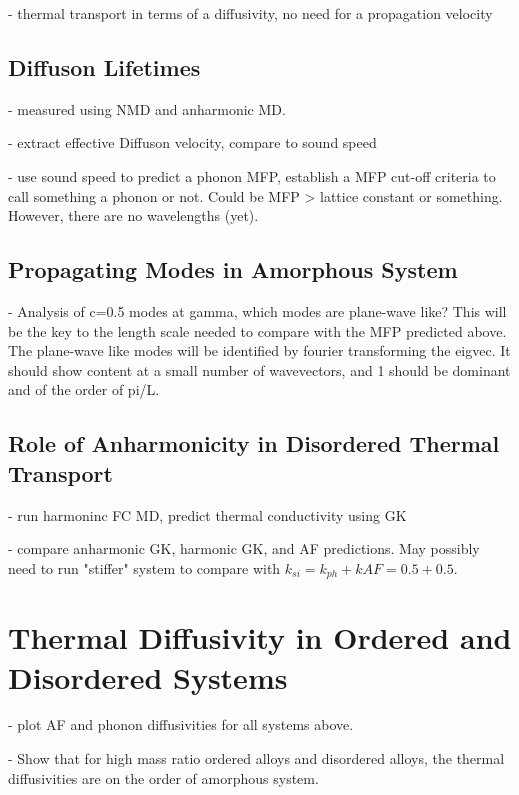 \documentclass[aps,prb,preprint,superscriptaddress,amsmath,amssymb,floatfix]{revtex4}
\begin{document}
- thermal transport in terms of a diffusivity, no need for a propagation velocity

\subsection{\label{S-Motivation-Amorphous}Diffuson Lifetimes}

- measured using NMD and anharmonic MD.

- extract effective Diffuson velocity, compare to sound speed

- use sound speed to predict a phonon MFP, establish a MFP cut-off criteria to call something a phonon or not.  Could be MFP > lattice constant or something.  However, there are no wavelengths (yet).

\subsection{\label{S-Motivation-Amorphous}Propagating Modes in Amorphous System}

- Analysis of c=0.5 modes at gamma, which modes are plane-wave like? This will be the key to the length scale needed to compare with the MFP predicted above. The plane-wave like modes will be identified by fourier transforming the eigvec.  It should show content at a small number of wavevectors, and 1 should be dominant and of the order of pi/L. 

\subsection{\label{S-Motivation-Amorphous}Role of Anharmonicity in Disordered Thermal Transport}

- run harmoninc FC MD, predict thermal conductivity using GK

- compare anharmonic GK, harmonic GK, and AF predictions. May possibly need to run "stiffer" system to compare with $k_{si} = k_{ph} + k{AF} = 0.5+0.5$. 

\section{\label{S-Motivation} Thermal Diffusivity in Ordered and Disordered Systems}



- plot AF and phonon diffusivities for all systems above.  

- Show that for high mass ratio ordered alloys and disordered alloys, the thermal diffusivities are on the order of amorphous system. 
\end{document}
